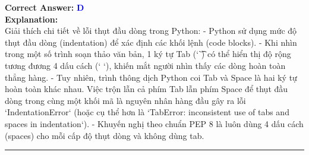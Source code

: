 \documentclass[11pt,a4paper]{article}
\begin{document}
\begin{minipage}{\textwidth}
\noindent \textbf{Correct Answer:} \textcolor{blue}{\textbf{D}} \\[4pt]
\noindent \textbf{Explanation:}\\
Giải thích chi tiết về lỗi thụt đầu dòng trong Python:\newline
- Python sử dụng mức độ thụt đầu dòng (indentation) để xác định các khối lệnh (code blocks).\newline
- Khi nhìn trong một số trình soạn thảo văn bản, 1 ký tự Tab (`\t`) có thể hiển thị độ rộng tương đương 4 dấu cách (`    `), khiến mắt người nhìn thấy các dòng hoàn toàn thẳng hàng.\newline
- Tuy nhiên, trình thông dịch Python coi Tab và Space là hai ký tự hoàn toàn khác nhau. Việc trộn lẫn cả phím Tab lẫn phím Space để thụt đầu dòng trong cùng một khối mã là nguyên nhân hàng đầu gây ra lỗi `IndentationError` (hoặc cụ thể hơn là `TabError: inconsistent use of tabs and spaces in indentation`).\newline
- Khuyến nghị theo chuẩn PEP 8 là luôn dùng 4 dấu cách (spaces) cho mỗi cấp độ thụt dòng và không dùng tab.
\end{minipage}
\vspace{0.8cm}
\hrule
\vspace{0.5cm}
\end{document}
